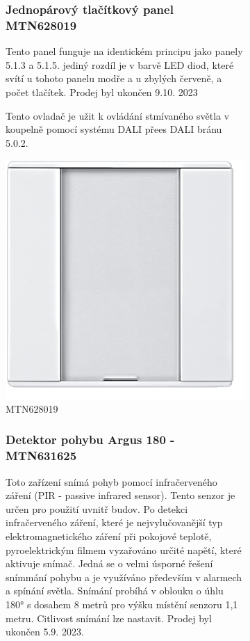 \documentclass[12pt, a4paper,
twoside,        %
openright
]{report}
\begin{document}
\begin{figure}[h]
\begin{subfigure}{0.9\textwidth}
	\subsubsection{Jednopárový tlačítkový panel  MTN628019}
	Tento panel funguje na identickém principu jako panely 5.1.3 a 5.1.5. jediný rozdíl je v barvě LED diod, které svítí u tohoto panelu modře a u zbylých červeně, a počet tlačítek. Prodej byl ukončen 9.10. 2023

	\noindent Tento ovladač je užit k ovládání stmívaného světla v koupelně pomocí systému DALI přees DALI bránu 5.0.2.

		\centering
		\includegraphics[scale=0.075]{image/MTN628019.jpg}
		\caption{MTN628019}
		\label{image:11}
\end{subfigure}

\begin{subfigure}{0.9\textwidth}
	\subsubsection{Detektor pohybu Argus 180 - MTN631625}
	Toto zařízení snímá pohyb pomocí infračerveného záření (PIR - passive infrared sensor). Tento senzor je určen pro použití uvnitř budov. Po detekci infračerveného záření, které je nejvylučovanější typ elektromagnetického záření při pokojové teplotě, pyroelektrickým filmem vyzařováno určité napětí, které aktivuje snímač. Jedná se o velmi úsporné řešení snímmání pohybu a je využíváno především v alarmech a spínání světla. Snímání probíhá v oblouku o úhlu 180° s dosahem 8 metrů pro výšku místění senzoru 1,1 metru. Citlivost snímání lze nastavit. Prodej byl ukončen 5.9. 2023.


\end{subfigure}
\end{figure}
\end{document}
